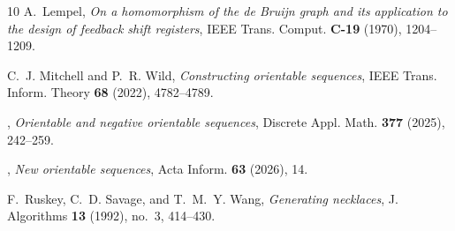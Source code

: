 \documentclass[a4paper,11pt]{article}
\theoremstyle{plain}
\theoremstyle{definition}
\theoremstyle{remark}
\begin{document}
\begin{thebibliography}{10}
 A.~Lempel, \emph{On a homomorphism of the de {B}ruijn graph and its
    application
  to the design of feedback shift registers}, {IEEE} Trans. Comput.
  \textbf{{\bf C-19}} (1970), 1204--1209.

 C.~J. Mitchell and P.~R. Wild, \emph{Constructing orientable sequences},
    IEEE
  Trans. Inform. Theory \textbf{68} (2022), 4782--4789.

 \bysame, \emph{Orientable and negative orientable sequences}, Discrete
    Appl.
  Math. \textbf{377} (2025), 242--259.

 \bysame, \emph{New orientable sequences}, Acta Inform. \textbf{63} (2026),
    14.

 F.~Ruskey, C.~D. Savage, and T.~M.~Y. Wang, \emph{Generating necklaces}, J.
  Algorithms \textbf{13} (1992), no.~3, 414--430.

\end{thebibliography}
\end{document}

